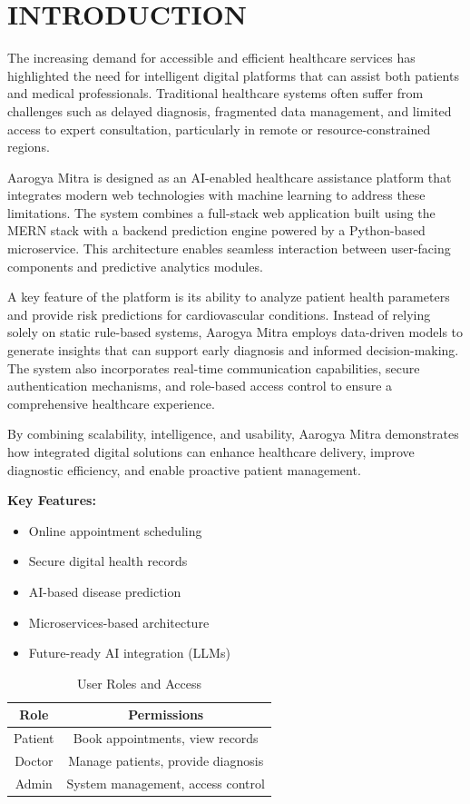 \documentclass[conference]{IEEEtran}
\begin{document}
\section{INTRODUCTION}

The increasing demand for accessible and efficient healthcare services has highlighted the need for intelligent digital platforms that can assist both patients and medical professionals. Traditional healthcare systems often suffer from challenges such as delayed diagnosis, fragmented data management, and limited access to expert consultation, particularly in remote or resource-constrained regions.

Aarogya Mitra is designed as an AI-enabled healthcare assistance platform that integrates modern web technologies with machine learning to address these limitations. The system combines a full-stack web application built using the MERN stack with a backend prediction engine powered by a Python-based microservice. This architecture enables seamless interaction between user-facing components and predictive analytics modules.

A key feature of the platform is its ability to analyze patient health parameters and provide risk predictions for cardiovascular conditions. Instead of relying solely on static rule-based systems, Aarogya Mitra employs data-driven models to generate insights that can support early diagnosis and informed decision-making. The system also incorporates real-time communication capabilities, secure authentication mechanisms, and role-based access control to ensure a comprehensive healthcare experience.

By combining scalability, intelligence, and usability, Aarogya Mitra demonstrates how integrated digital solutions can enhance healthcare delivery, improve diagnostic efficiency, and enable proactive patient management.

\textbf{Key Features:}
\begin{itemize}
\item Online appointment scheduling
\item Secure digital health records
\item AI-based disease prediction
\item Microservices-based architecture
\item Future-ready AI integration (LLMs)
\end{itemize}


\begin{table}[htbp]
\caption{User Roles and Access}
\centering
\begin{tabular}{|c|c|}
\hline
Role & Permissions \\
\hline
Patient & Book appointments, view records \\
Doctor & Manage patients, provide diagnosis \\
Admin & System management, access control \\
\hline
\end{tabular}
\end{table}
\end{document}
